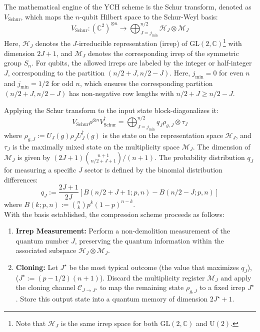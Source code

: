 \documentclass[a4paper,onecolumn,11pt]{quantumarticle}
\def\h{\mathcal{H}}
\def\C{\mathcal{C}}
\def\map{\mathcal}
\begin{document}
The mathematical engine of the YCH scheme is the Schur transform, denoted as $V_\mathrm{Schur}$, which maps the $n$-qubit Hilbert space to the Schur-Weyl basis:
\begin{equation}
    V_\mathrm{Schur}: (\mathbb{C}^2)^{\otimes n} \to \bigoplus_{J=j_{\min}}^{n/2} \h_J \otimes \map{M}_J
\end{equation}
Here, $\h_J$ denotes the $J$-irreducible representation (irrep) of GL$(2,\mathbb{C})$\footnote{Note that $\h_J$ is the same irrep space for both $\mathrm{GL}(2,\mathbb{C})$ and $\mathrm{U}(2)$.} with dimension $2J+1$, and $\map{M}_J$ denotes the corresponding irrep of the symmetric group $S_n$. For qubits, the allowed irreps are labeled by the integer or half-integer $J$, corresponding to the partition $(n/2+J, n/2-J)$. Here, $j_{\min} = 0$ for even $n$ and $j_{\min} = 1/2$ for odd $n$, which ensures the corresponding partition $(n/2+J, n/2-J)$ has non-negative row lengths with $n/2+J \ge n/2-J$.

Applying the Schur transform to the input state block-diagonalizes it:
\begin{equation}\label{eq:schur}
    V_\mathrm{Schur} \rho^{\otimes n} V_\mathrm{Schur}^\dagger = \bigoplus_{J=j_{\min}}^{n/2} q_J \rho_{g,J} \otimes \tau_J
\end{equation}
where $\rho_{g,J} :=  U_J(g) \rho_J U_J^\dagger(g)$ is the state on the representation space $\h_J$, and $\tau_J$ is the maximally mixed state on the multiplicity space $\map{M}_J$. The dimension of $\map{M}_J$ is given by $(2J+1)\binom{n+1}{n/2+J+1}/(n+1)$. The probability distribution $q_J$ for measuring a specific $J$ sector is defined by the binomial distribution differences:
\[
    q_J :=  \frac{2J+1}{2J}\left[B(n/2+J+1;p,n)-B(n/2-J;p,n)\right]
\]
where $B(k;p,n) :=  \binom{n}{k}p^{k}(1-p)^{n-k}$.\\

With the basis established, the compression scheme proceeds as follows:
\begin{enumerate}
    \item \textbf{Irrep Measurement:} Perform a non-demolition measurement of the quantum number $J$, preserving the quantum information within the associated subspace $\h_J \otimes \map{M}_J$. 
    \item \textbf{Cloning:} Let $J^\star$ be the most typical outcome (the value that maximizes $q_J$), ($J^\star:= (p-1/2)(n+1)$). Discard the multiplicity register $\map{M}_J$ and apply the cloning channel $\C_{J\to J^\star}$ to map the remaining state $\rho_{g,J}$ to a fixed irrep $J^\star$. Store this output state into a quantum memory of dimension $2J^\star + 1$.
\end{enumerate}
\end{document}
